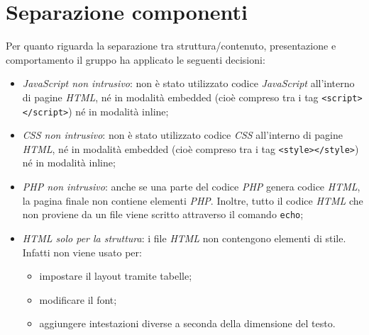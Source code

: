 \section{Separazione componenti}
Per quanto riguarda la separazione tra struttura/contenuto, presentazione e comportamento il gruppo ha
applicato le seguenti decisioni:
\begin{itemize}
	\item \textit{JavaScript non intrusivo}: non è stato utilizzato codice \textit{JavaScript}
	all'interno di pagine \textit{HTML}, né in modalità embedded (cioè compreso tra i tag 
	\texttt{{\textless}script{\textgreater}{\textless}/script{\textgreater}}) né in modalità inline;
	\item \textit{CSS non intrusivo}: non è stato utilizzato codice \textit{CSS}
	all'interno di pagine \textit{HTML}, né in modalità embedded (cioè compreso tra i tag 
	\texttt{{\textless}style{\textgreater}{\textless}/style{\textgreater}}) né in modalità inline;
	\item \textit{PHP non intrusivo}: anche se una parte del codice \textit{PHP} genera codice
	\textit{HTML}, la pagina finale non contiene elementi \textit{PHP}. Inoltre, tutto il codice
	\textit{HTML} che non proviene da un file viene scritto attraverso il comando \texttt{echo};
	\item \textit{HTML solo per la struttura}: i file \textit{HTML} non contengono elementi di stile.
	Infatti non viene usato per:
	\begin{itemize}
		\item impostare il layout tramite tabelle;
		\item modificare il font;
		\item aggiungere intestazioni diverse a seconda della dimensione del testo.
	\end{itemize}
\end{itemize}